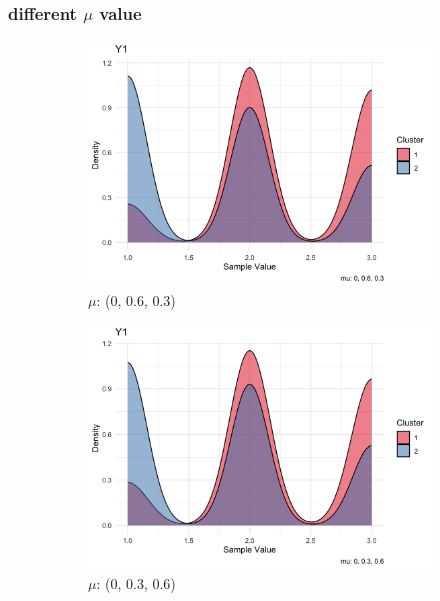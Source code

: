 \documentclass{article}
\begin{document}
\subsubsection*{different $\mu$ value}
\begin{figure}[h]
  \centering
  \begin{subfigure}{0.3\textwidth}
      \centering
      \includegraphics[width=\textwidth]{images/mu_0_06_03.png}
      \caption{$\mu$: (0, 0.6, 0.3)}
  \end{subfigure}
  \hfill
  \begin{subfigure}{0.3\textwidth}
      \centering
      \includegraphics[width=\textwidth]{images/mu_0_03_06.png}
      \caption{$\mu$: (0, 0.3, 0.6)}
  \end{subfigure}
  \hfill
  \begin{subfigure}{0.3\textwidth}

\end{subfigure}
\end{figure}
\end{document}

